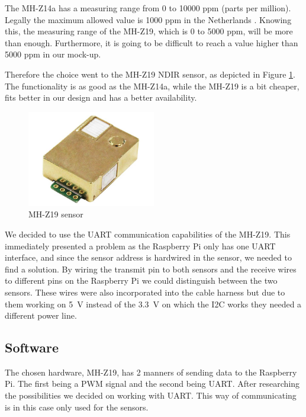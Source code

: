 \documentclass[a4paper,oneside]{book}
\begin{document}
The MH-Z14a has a measuring range from 0 to 10000 ppm (parts per million).
Legally the maximum allowed  value is 1000 ppm in the Netherlands
\cite{bouwbesluit}. Knowing this, the measuring range of the MH-Z19, which is 0
to 5000 ppm, will be more than enough. Furthermore, it is going to be difficult
to reach a  value higher than 5000 ppm in our mock-up.

Therefore the choice went to the MH-Z19 NDIR sensor, as depicted in Figure
\ref{fig:mh-z19}. The functionality is as good as the MH-Z14a, while the
MH-Z19 is a bit cheaper, fits better in our design and has a better
availability.

\begin{figure}[!htb]
\centering
\includegraphics[width=0.5\textwidth]{images/co2.jpg}
\caption{MH-Z19  sensor \protect\cite{mh-z19}}
\label{fig:mh-z19}
\end{figure}

We decided to use the UART communication capabilities of the MH-Z19. This
immediately presented a problem as the Raspberry Pi only has one UART
interface, and since the sensor address is hardwired in the sensor, we needed
to find a solution. By wiring the transmit pin to both sensors and the receive
wires to different pins on the Raspberry Pi we could distinguish between the
two sensors. These wires were also incorporated into the cable harness but due
to them working on \SI{5}{\volt} instead of the \SI{3.3}{\volt} on which the
I2C works they needed a different power line.

\subsection{Software}
The chosen hardware, MH-Z19, has 2 manners of sending data to the Raspberry Pi.
The first being a PWM signal and the second being UART. After researching the
possibilities we decided on working with UART. This way of communicating is in
this case only used for the  sensors.
\end{document}
